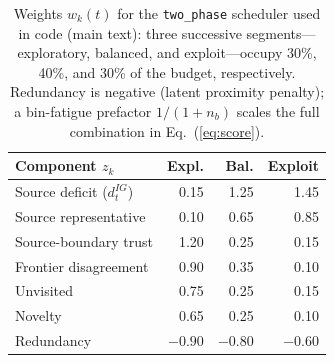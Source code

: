 \begin{table}[htbp]
    \centering
    \caption{Weights $w_k(t)$ for the \texttt{two\_phase} scheduler used in code (main text): three successive segments---exploratory, balanced, and exploit---occupy 30\%, 40\%, and 30\% of the budget, respectively. Redundancy is negative (latent proximity penalty); a bin-fatigue prefactor $1/(1+n_b)$ scales the full combination in Eq.~(\ref{eq:score}).}
    \label{tab:si_policy_weights}
    \small
    \setlength{\tabcolsep}{3.5pt}
    \begin{tabular}{@{}lrrr@{}}
        \toprule
        Component $z_k$ & Expl. & Bal. & Exploit \\
        \midrule
        Source deficit ($d^{IG}_t$) & 0.15 & 1.25 & 1.45 \\
        Source representative & 0.10 & 0.65 & 0.85 \\
        Source-boundary trust & 1.20 & 0.25 & 0.15 \\
        Frontier disagreement & 0.90 & 0.35 & 0.10 \\
        Unvisited & 0.75 & 0.25 & 0.15 \\
        Novelty & 0.65 & 0.25 & 0.10 \\
        Redundancy & $-0.90$ & $-0.80$ & $-0.60$ \\
        \bottomrule
    \end{tabular}
\end{table}

